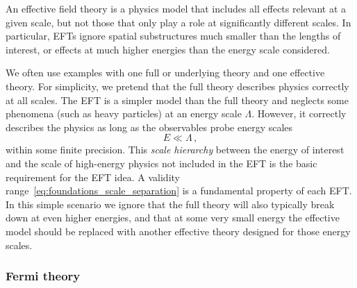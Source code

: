 An effective field theory is a physics model that includes all effects
relevant at a given scale, but not those that only play a role at
significantly different scales. In particular, EFTs ignore spatial
substructures much smaller than the lengths of interest, or effects at
much higher energies than the energy scale considered.

We often use examples with one full or underlying theory and
one effective theory. For simplicity, we pretend that the full theory
describes physics correctly at all scales. The EFT is a simpler model
than the full theory and neglects some phenomena (such as heavy
particles) at an energy scale $\Lambda$. However, it correctly describes
the physics as long as the observables probe energy scales
%
\begin{equation}
  E \ll \Lambda \,,
  \label{eq:foundations_scale_separation}
\end{equation}
%
within some finite precision. This \emph{scale hierarchy} between the
energy of interest and the scale of high-energy physics not included
in the EFT is the basic requirement for the EFT idea. A validity
range~\eqref{eq:foundations_scale_separation} is a fundamental
property of each EFT. In this simple scenario we ignore that the full
theory will also typically break down at even higher energies, and
that at some very small energy the effective model should be replaced
with another effective theory designed for those energy scales.



\subsubsection{Fermi theory}

